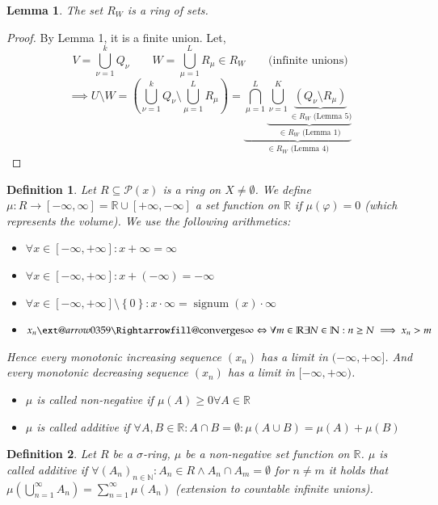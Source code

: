 \documentclass{article}
\makeatletter
\newtheorem{definition}{Definition}  \numberwithin{definition}{section}
\newtheorem{lemma}{Lemma}  \numberwithin{lemma}{section}
\newcommand{\set}[1]{\left\{#1\right\}}
\newcommand{\xRightarrow}[2][]{\ext@arrow 0359\Rightarrowfill@{#1}{#2}}
\makeatother
\begin{document}
\begin{lemma}
  \label{l:six}
  The set $R_W$ is a ring of sets.
\end{lemma}
\begin{proof}
  By Lemma 1, it is a finite union. Let,
  \[ V = \bigcup_{\nu=1}^k Q_{\nu} \qquad W = \bigcup_{\mu=1}^L R_{\mu} \in R_W \qquad \text{(infinite unions)} \]
  \[
    \implies U \setminus W = \left( \bigcup_{\nu=1}^k Q_{\nu} \setminus \bigcup_{\mu=1}^L R_{\mu}\right)
    = \underbrace{\bigcap_{\mu=1}^L \underbrace{\bigcup_{\nu=1}^K \underbrace{(Q_\nu \setminus R_\mu)}_{\in R_W \text{ (Lemma 5)}}}_{\in R_W \text{ (Lemma 1)}}}_{\in R_W \text{ (Lemma 4)}}
  \]
\end{proof}
\begin{definition}
  Let $R \subseteq \mathcal P(x)$ is a ring on $X \neq \emptyset$.
  We define $\mu: R \to [-\infty, \infty] = \mathbb R \cup [+\infty, -\infty]$
  a \emph{set function on $\mathbb R$} if $\mu(\varphi) = 0$ (which represents the volume).
  We use the following arithmetics:
  \begin{itemize}
    \item $\forall x \in [-\infty, +\infty]: x + \infty = \infty$
    \item $\forall x \in [-\infty, +\infty]: x + (-\infty) = -\infty$
    \item $\forall x \in [-\infty, +\infty] \setminus \set{0}: x \cdot \infty = \operatorname{signum}(x) \cdot \infty$
    \item $x_n \xRightarrow{\text{converges}} \infty \Leftrightarrow \forall m \in \mathbb R \exists N \in \mathbb N: n \geq N \implies x_n > m$
  \end{itemize}
  Hence every monotonic increasing sequence $(x_n)$ has a limit in $(-\infty, +\infty]$.
  And every monotonic decreasing sequence $(x_n)$ has a limit in $[-\infty, +\infty)$.
  \begin{itemize}[resume]
    \item $\mu$ is called \emph{non-negative} if $\mu(A) \geq 0 \forall A \in \mathbb R$
    \item $\mu$ is called \emph{additive} if $\forall A, B \in \mathbb R: A \cap B = \emptyset: \mu(A \cup B) = \mu(A) + \mu(B)$
  \end{itemize}
\end{definition}

\begin{definition}
  Let $R$ be a $\sigma$-ring, $\mu$ be a non-negative set function on $\mathbb R$.
  $\mu$ is called \emph{additive} if $\forall (A_n)_{n \in \mathbb N}: A_n \in R \land A_n \cap A_m = \emptyset$ for $n \neq m$ it holds that $\mu\left(\bigcup_{n=1}^\infty A_n\right) = \sum_{n=1}^\infty \mu(A_n)$ (extension to countable infinite unions).
\end{definition}
\end{document}
